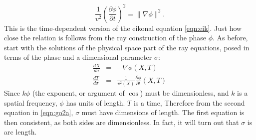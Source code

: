 \begin{equation}
\label{eqn:teik}
\frac{1}{v^2} \left(\frac{\partial \phi}{\partial t}\right)^2 = \|\nabla \phi\|^2.
\end{equation}
This is the time-dependent version of the eikonal equation \ref{eqn:eik}. Just how close the relation is follows from the ray construction of the phase $\phi$. As before, start with the solutions of the physical space part of the ray equations, posed in terms of the phase and a dimensional parameter $\sigma$:
\begin{eqnarray}
\label{eqn:go2a}
\frac{dX}{d\sigma} & = & -\nabla \phi(X,T) \nonumber \nonumber \\
 \frac{dT}{d\sigma} & = & \frac{1}{v^2(X)}\frac{\partial \phi}{\partial t}(X,T)
\end{eqnarray}
Since $k\phi$ (the exponent, or argument of $\cos$) must be dimensionless, and $k$ is a spatial frequency, $\phi$ has units of length. $T$ is a time, Therefore from the second equation in \ref{eqn:go2a}, $\sigma$ must have dimensions of length. The first equation is then consistent, as both sides are dimensionless. In fact, it will turn out that $\sigma$ is arc length.

